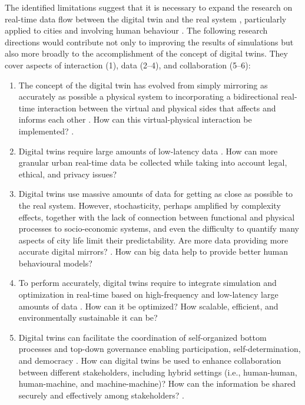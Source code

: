 The identified limitations suggest that it is necessary to expand the research on real-time data flow between the digital twin and the real system \citep{Liu2021}, particularly applied to cities \citep{Fuller2020} and involving human behaviour \citep{Hudson-Smith2022}. The following research directions would contribute not only to improving the results of simulations but also more broadly to the accomplishment of the concept of digital twins. They cover aspects of interaction (1), data (2–4), and collaboration (5–6):
\begin{enumerate}
    \item The concept of the digital twin has evolved from simply mirroring as accurately as possible a physical system \citep{Grieves2014} to incorporating a bidirectional real-time interaction between the virtual and physical sides that affects and informs each other \citep{Wang2019,Liu2021}. How can this virtual-physical interaction be implemented? \citep{Sepasgozar2021}.
    \item Digital twins require large amounts of low-latency data \citep{Fuller2020}. How can more granular urban real-time data be collected while taking into account legal, ethical, and privacy issues?
    \item Digital twins use massive amounts of data for getting as close as possible to the real system. However, stochasticity, perhaps amplified by complexity effects, together with the lack of connection between functional and physical processes to socio-economic systems, and even the difficulty to quantify many aspects of city life limit their predictability. Are more data providing more accurate digital mirrors? \citep{Batty2018,Caldarelli2023}. How can big data help to provide better human behavioural models?
    \item To perform accurately, digital twins require to integrate simulation and optimization in real-time based on high-frequency and low-latency large amounts of data \citep{Fuller2020,Francisco2020,Ruohomaki2018}. How can it be optimized? How scalable, efficient, and environmentally sustainable it can be?
    \item Digital twins can facilitate the coordination of self-organized bottom processes and top-down governance enabling participation, self-determination, and democracy \citep{Caldarelli2023}. How can digital twins be used to enhance collaboration between different stakeholders, including hybrid settings (i.e., human-human, human-machine, and machine-machine)? How can the information be shared securely and effectively among stakeholders? \citep{Sepasgozar2021}.
\end{enumerate}

